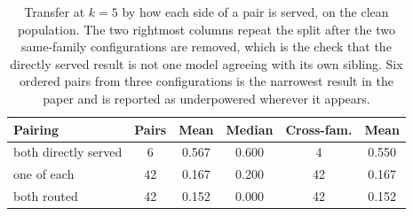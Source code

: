 \begin{table}[t]
\centering
\footnotesize
\setlength{\tabcolsep}{4pt}
\begin{tabular}{l S[table-format=2.0] S[table-format=1.3] S[table-format=1.3] S[table-format=2.0] S[table-format=1.3]}
\toprule
Pairing & {Pairs} & {Mean} & {Median} & {Cross-fam.} & {Mean} \\
\midrule
both directly served & 6 & 0.567 & 0.600 & 4 & 0.550 \\
one of each & 42 & 0.167 & 0.200 & 42 & 0.167 \\
both routed & 42 & 0.152 & 0.000 & 42 & 0.152 \\
\bottomrule
\end{tabular}
\caption{Transfer at $k = 5$ by how each side of a pair is served, on the clean population. The two rightmost columns repeat the split after the two same-family configurations are removed, which is the check that the directly served result is not one model agreeing with its own sibling. Six ordered pairs from three configurations is the narrowest result in the paper and is reported as underpowered wherever it appears.}
\label{tab:serving}
\end{table}
